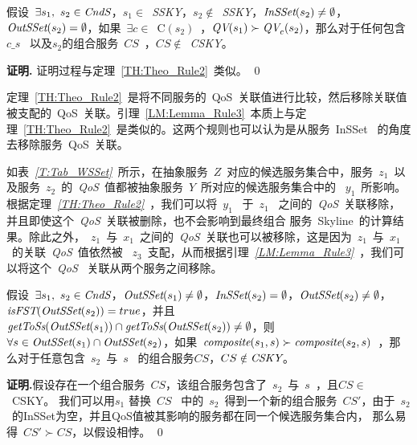 \begin{lemma}\label{LM:Lemma_Rule3}

假设~$\exists s_{1},\ s_{2} \in \emph{CndS}$，$s_{1} \in$~\emph{SSKY}，$s_{2} \notin$~\emph{SSKY}，$\emph{InSSet}(s_{2}) \neq \emptyset$，$\emph{OutSSet}(s_{2}) = \emptyset$，如果~$\exists c \in$~C$(s_{2})$~，$\emph{QV}(s_{1}) \succ \emph{QV}_{c}(s_{2})$，那么对于任何包含~$c\_s$~ 以及$s_{2}$的组合服务~$CS$~，$CS \notin$~\emph{CSKY}。

\end{lemma}

\textbf{证明.} 证明过程与定理~\ref{TH:Theo_Rule2}~类似。
\qed

定理~\ref{TH:Theo_Rule2}~是将不同服务的~QoS~关联值进行比较，然后移除关联值被支配的~QoS~关联。引理~\ref{LM:Lemma_Rule3}~本质上与定理~\ref{TH:Theo_Rule2}~是类似的。这两个规则也可以认为是从服务~InSSet~ 的角度去移除服务~QoS~关联。

\begin{example}

如表~\emph{\ref{T:Tab_WSSet}}~所示，在抽象服务~$Z$~对应的候选服务集合中，服务~$z_{1}$~以及服务~$z_{2}$~的~\emph{QoS}~值都被抽象服务~$Y$~所对应的候选服务集合中的
~$y_{1}$~所影响。根据定理~\emph{\ref{TH:Theo_Rule2}}~，我们可以将~$y_{1}$~ 于~$z_{1}$~ 之间的~\emph{QoS}~关联移除，并且即使这个~\emph{QoS}~关联被删除，也不会影响到最终组合
服务~Skyline~的计算结果。除此之外，~$z_{1}$~与~$x_{1}$~之间的~\emph{QoS}~关联也可以被移除，这是因为~$z_{1}$~与~$x_{1}$~的关联~\emph{QoS}~值依然被
~$z_{3}$~支配，从而根据引理~\emph{\ref{LM:Lemma_Rule3}}~，我们可以将这个~\emph{QoS}~ 关联从两个服务之间移除。

\end{example}

\begin{theorem}\label{TH:Theo_Rule4}

假设~$\exists s_{1},\ s_{2} \in \emph{CndS}$，$\emph{OutSSet}(s_{1})\neq \emptyset$，$\emph{InSSet}(s_{2}) = \emptyset$，$\emph{OutSSet}(s_{2})\neq \emptyset$，$\emph{isFST}(\emph{OutSSet}(s_{2})) = true$，并且~$\emph{getToSs}(\emph{OutSSet}(s_{1})) \cap \emph{getToSs}(\emph{OutSSet}(s_{2})) \neq \emptyset$，则~
$\forall s \in \emph{OutSSet}(s_{1}) \cap \emph{OutSSet}(s_{2})$，如果~$\emph{composite}(s_{1},s) \succ \emph{composite}(s_{2},s)$~，那么对于任意包含~$s_{2}$~与~$s$~ 的组合服务$CS$，$CS \notin \emph{CSKY}$。

\end{theorem}

\textbf{证明.}假设存在一个组合服务~$CS$，该组合服务包含了~$s_{2}$~与~$s$~，且$CS \in$~CSKY。 我们可以用$s_{1}$ 替换~$CS$~ 中的~$s_{2}$~得到一个新的组合服务~$CS'$，由于~$s_{2}$~的InSSet为空，并且QoS值被其影响的服务都在同一个候选服务集合内，
那么易得~$CS' \succ CS$，以假设相悖。
\qed

